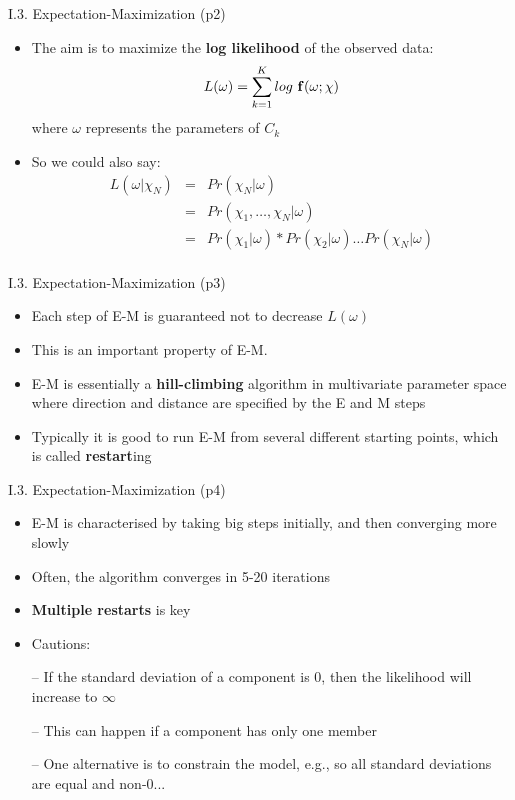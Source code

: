 \documentclass[handout]{beamer}
\newcommand{\strong}[1]{\textbf{\color{teal} #1}}
\newcommand{\stronger}[1]{\textbf{\color{purple} #1}}
\begin{document}
\begin{frame}{I.3. Expectation-Maximization (p2)}
\begin{itemize}
\item The aim is to maximize the \stronger{log likelihood} of the observed data:
\[
	L( \omega ) = \sum_{k=1}^{K}{ log ~ {\bf f}( \omega; \chi ) }
\]
where $\omega$ represents the parameters of $C_k$
\item[]
\item So we could also say:
\[
\begin{array}{rcl}
L( \omega | \chi_N ) & = & Pr( \chi_N | \omega ) \\
                     & = & Pr( \chi_1,\ldots,\chi_N | \omega ) \\
                     & = & Pr( \chi_1 | \omega ) * Pr( \chi_2 | \omega ) \ldots Pr( \chi_N | \omega )\\
\end{array}
\]
\end{itemize}
\end{frame}
\begin{frame}{I.3. Expectation-Maximization (p3)}
\begin{itemize}
\item Each step of E-M is guaranteed not to decrease $L(\omega)$
\item This is an important property of E-M.
\item E-M is essentially a \strong{hill-climbing} algorithm in multivariate parameter space where direction and distance are specified by the E and M steps
\item[]
\item Typically it is good to run E-M from several different starting points, which is called \strong{restart}ing
\end{itemize}
\end{frame}
\begin{frame}{I.3. Expectation-Maximization (p4)}
\begin{itemize}
\item E-M is characterised by taking big steps initially, and then converging more slowly
\item Often, the algorithm converges in 5-20 iterations
\item \strong{Multiple restarts} is key
\item Cautions:
\item[--] If the standard deviation of a component is $0$, then the likelihood will increase to $\infty$
\item[--] This can happen if a component has only one member
\item[--] One alternative is to constrain the model, e.g., so all standard deviations are equal and non-$0$...
\end{itemize}
\end{frame}
\end{document}
